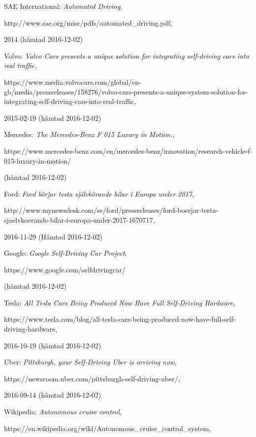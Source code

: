 \documentclass[a4paper]{IEEEtran}
\begin{document}
\begin{thebibliography}{77}
	SAE International: \emph{Automated Driving}, 
	
	http://www.sae.org/misc/pdfs/automated\_driving.pdf, 
	
	2014 (hämtad 2016-12-02)
	
	Volvo: \emph{Volvo Cars presents a unique solution for integrating self-driving cars into real traffic}, 
	
	https://www.media.volvocars.com/global/en-gb/media/pressreleases/158276/volvo-cars-presents-a-unique-system-solution-for-integrating-self-driving-cars-into-real-traffic, 
	
	2015-02-19 (hämtad 2016-12-02)
	
	Mercedes: \emph{The Mercedes-Benz F 015 Luxury in Motion.}, 
	
	https://www.mercedes-benz.com/en/mercedes-benz/innovation/research-vehicle-f-015-luxury-in-motion/ 
	
	(hämtad 2016-12-02)
	
	Ford: \emph{Ford börjar testa självkörande bilar i Europa under 2017}, 
	
	http://www.mynewsdesk.com/se/ford/pressreleases/ford-boerjar-testa-sjaelvkoerande-bilar-i-europa-under-2017-1670717, 
	
	2016-11-29 (Hämtad 2016-12-02)
	
	Google: \emph{Google Self-Driving Car Project}, 
	
	https://www.google.com/selfdrivingcar/ 
	
	(hämtad 2016-12-02)
	
	Tesla: \emph{All Tesla Cars Being Produced Now Have Full Self-Driving Hardware}, 
	
	https://www.tesla.com/blog/all-tesla-cars-being-produced-now-have-full-self-driving-hardware, 
	
	2016-10-19 (hämtad 2016-12-02)
	
	Uber: \emph{Pittsburgh, your Self-Driving Uber is arriving now}, 
	
	https://newsroom.uber.com/pittsburgh-self-driving-uber/, 
	
	2016-09-14 (hämtad 2016-12-02)
	
	Wikipedia: \emph{Autonomous cruise control}, 
	
	https://en.wikipedia.org/wiki/Autonomous\_cruise\_control\_system, 
	

\end{thebibliography}
\end{document}
